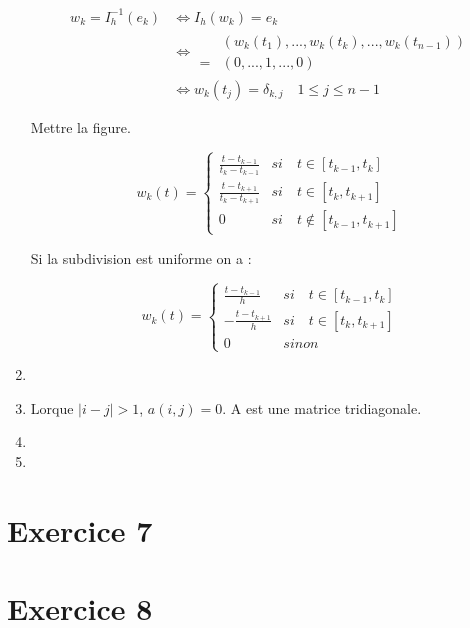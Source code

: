 \documentclass[12pt, letterpaper]{article}
\begin{document}
\begin{enumerate}
  \begin{equation*}
    \begin{split}
      w_k = I_h^{-1}(e_k) & \iff I_h(w_k) = e_k \\
      & \iff
      \begin{split}
        & (w_k(t_1), ..., w_k(t_k), ..., w_k(t_{n-1})) \\
        = & (0, ..., 1, ..., 0)
      \end{split} \\
      & \iff w_k(t_j) = \delta_{k,j} \quad 1 \le j \le n-1
    \end{split}
  \end{equation*}

  Mettre la figure.

  \begin{equation*}
    w_k(t) = 
    \left\{
    \begin{array}{ll}
      \frac{t - t_{k-1}}{t_k - t_{k-1}} & si \quad t \in [t_{k-1},
        t_k] \\
      \frac{t - t_{k+1}}{t_k - t_{k+1}} & si \quad t \in [t_k,
        t_{k+1}] \\
      0 & si \quad t \notin [t_{k-1}, t_{k+1}]
    \end{array}
    \right.
  \end{equation*}

  Si la subdivision est uniforme on a :

  \begin{equation*}
    w_k(t) = 
    \left\{
    \begin{array}{ll}
      \frac{t - t_{k-1}}{h} & si \quad t \in [t_{k-1},
        t_k] \\
      - \frac{t - t_{k+1}}{h} & si \quad t \in [t_k,
        t_{k+1}] \\
      0 & sinon
    \end{array}
    \right.
  \end{equation*}

\item

\item
  Lorque $|i - j| > 1$, $a(i, j) = 0$. A est une matrice tridiagonale.

\item

\item
  

\end{enumerate}

\section*{Exercice 7}

\section*{Exercice 8}
\end{document}
